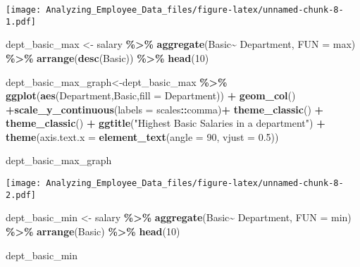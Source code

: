 \documentclass[
]{article}
\newenvironment{Shaded}{\begin{snugshade}}{\end{snugshade}}
\newcommand{\AttributeTok}[1]{\textcolor[rgb]{0.13,0.29,0.53}{#1}}
\newcommand{\DecValTok}[1]{\textcolor[rgb]{0.00,0.00,0.81}{#1}}
\newcommand{\FloatTok}[1]{\textcolor[rgb]{0.00,0.00,0.81}{#1}}
\newcommand{\FunctionTok}[1]{\textcolor[rgb]{0.13,0.29,0.53}{\textbf{#1}}}
\newcommand{\NormalTok}[1]{#1}
\newcommand{\OtherTok}[1]{\textcolor[rgb]{0.56,0.35,0.01}{#1}}
\newcommand{\SpecialCharTok}[1]{\textcolor[rgb]{0.81,0.36,0.00}{\textbf{#1}}}
\newcommand{\StringTok}[1]{\textcolor[rgb]{0.31,0.60,0.02}{#1}}
\begin{document}
\texttt{[image: Analyzing\_Employee\_Data\_files/figure-latex/unnamed-chunk-8-1.pdf]}

\begin{Shaded}
\begin{Highlighting}[]
\NormalTok{dept\_basic\_max }\OtherTok{\textless{}{-}}\NormalTok{ salary }\SpecialCharTok{\%\textgreater{}\%}
  \FunctionTok{aggregate}\NormalTok{(Basic}\SpecialCharTok{\textasciitilde{}}\NormalTok{ Department,}
            \AttributeTok{FUN =}\NormalTok{ max) }\SpecialCharTok{\%\textgreater{}\%} 
  \FunctionTok{arrange}\NormalTok{(}\FunctionTok{desc}\NormalTok{(Basic)) }\SpecialCharTok{\%\textgreater{}\%}
  \FunctionTok{head}\NormalTok{(}\DecValTok{10}\NormalTok{)}
  


\NormalTok{dept\_basic\_max\_graph}\OtherTok{\textless{}{-}}\NormalTok{dept\_basic\_max }\SpecialCharTok{\%\textgreater{}\%} 
  \FunctionTok{ggplot}\NormalTok{(}\FunctionTok{aes}\NormalTok{(Department,Basic,}\AttributeTok{fill =}\NormalTok{ Department)) }\SpecialCharTok{+} 
  \FunctionTok{geom\_col}\NormalTok{() }\SpecialCharTok{+}\FunctionTok{scale\_y\_continuous}\NormalTok{(}\AttributeTok{labels =}\NormalTok{ scales}\SpecialCharTok{::}\NormalTok{comma)}\SpecialCharTok{+} 
  \FunctionTok{theme\_classic}\NormalTok{()  }\SpecialCharTok{+} 
  \FunctionTok{theme\_classic}\NormalTok{()  }\SpecialCharTok{+} 
  \FunctionTok{ggtitle}\NormalTok{(}\StringTok{"Highest Basic Salaries in a department"}\NormalTok{) }\SpecialCharTok{+} 
  \FunctionTok{theme}\NormalTok{(}\AttributeTok{axis.text.x =} \FunctionTok{element\_text}\NormalTok{(}\AttributeTok{angle =} \DecValTok{90}\NormalTok{, }\AttributeTok{vjust =} \FloatTok{0.5}\NormalTok{))}


\NormalTok{dept\_basic\_max\_graph}
\end{Highlighting}
\end{Shaded}

\texttt{[image: Analyzing\_Employee\_Data\_files/figure-latex/unnamed-chunk-8-2.pdf]}

\begin{Shaded}
\begin{Highlighting}[]
\NormalTok{dept\_basic\_min }\OtherTok{\textless{}{-}}\NormalTok{  salary }\SpecialCharTok{\%\textgreater{}\%}
  \FunctionTok{aggregate}\NormalTok{(Basic}\SpecialCharTok{\textasciitilde{}}\NormalTok{ Department,}
            \AttributeTok{FUN =}\NormalTok{ min) }\SpecialCharTok{\%\textgreater{}\%} 
  \FunctionTok{arrange}\NormalTok{(Basic) }\SpecialCharTok{\%\textgreater{}\%} 
  \FunctionTok{head}\NormalTok{(}\DecValTok{10}\NormalTok{)}
  


\NormalTok{dept\_basic\_min}
\end{Highlighting}
\end{Shaded}
\end{document}
